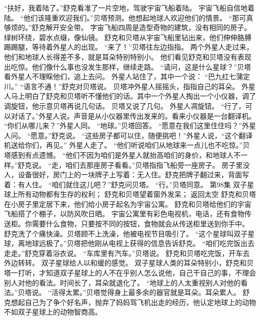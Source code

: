 \documentclass[a4paper,12pt,UTF8,twoside]{ctexbook}
\begin{document}
        “扶好，我着陆了。”舒克看准了一片空地，驾驶宇宙飞船着陆。 
        宇宙飞船自信地着陆。 
        “他们该隆重欢迎我们。”贝塔预测。他想起地球人欢迎他们的情景。 
        “那可真够烦的。”舒克解开安全带。 
        字宙飞船四周是造型奇物的建筑，没有相同的房子。绿树环绕，碧水点缀，像仙镜。 
        舒克和贝塔从宇宙飞船里钻出来，他们伸伸胳膊踢踢腿，等待着外星人的出现。 
        “来了！”贝塔往左边指指。 
        两个外星人走过来，他们和地球人长得差不多，就是耳朵特别特别小。 
        他们看见舒克和贝塔没有表现出吃惊。他们像什么事也没发生那样，继续走路。 
        “请问，这是什么星球？”贝塔看外星人不理睬他们，追上去问。 
        外星人站住了，其中一个说： 
        “巴九红七蒲定川。” 
        “语言不通！”舒克对贝塔说。 
        贝塔冲外星人摇摇头，指指自己的耳朵。 
        外星人马上明白了舒克和贝塔听不懂他们的话。其中一个外星人掏出一个小仪器，调了调旋钮，他示意贝塔再说几句话。 
        贝塔又说了几句。 
        外星人凋旋钮。 
        “行了，可以对话了。”外星人说。声音是从小仪器里传出发来的。看来小仪器是一台翻译机。 
        “你们从哪儿来？”外星人同。 
        “地球。”贝塔回答。 
        “愿意在我们这里住住吗？”外星人问。 
        “愿意。”舒克说。 
        “这些房子都可以住，随便挑吧！”外星人说，“这个翻译机送给你们，再见。” 
        外星人走了。 
        “他们听说咱们从地球来一点儿也不吃惊。”贝塔感到有点遗憾。 
        “他们不因为咱们是外星人就抬高咱们的身价，和地球人不一样。”舒克说。 
        “走，咱们去那座房子看看。”贝塔指指飞船旁一座房子。 
      房子里没人，设备很好，房门上的一块牌子上写着：无人住。舒克把牌子翻过来，背面写着：有人住。 
        “咱们就住这儿吧？”舒克问贝塔。 
        “行。”贝塔同意。   第98集 
        双子星球上所有动物都有生存的权利； 
        舒克和贝塔望着窗外发呆； 
        返回太空   
        舒克和贝塔在小房子里定居下来，他们给小房子起名为宇宙公寓。 
        舒克和贝塔给他们的宇宙飞船搭了个棚子，以防风吹日晒。 
        宇宙公寓里有彩色电视机，电话，还有食物传送柜。你需要什么食物，只要按不同的按钮，食物就会从传送柜里送到你手中。 
        舒克洗了个痛快澡。贝塔顾不上洗澡，他被电视节目吸引了。 
        “这个星球叫双子星球，离地球远极了。”贝塔把他刚从电视上获得的信息告诉舒克。 
        “咱们吃完饭出去走走。”舒克穿着浴衣说。 
        “车库里有汽车。”贝塔说。 
        舒克和贝塔吃完饭，开车去外边转转。 
        双子星球给人以和缓的感觉。 
        双子星球人类的耳朵特别小，舒克和贝塔一打听，才知道双子星球上的人不在乎别人怎么说他，自己干自己的事，不理会别人对他的看法。时间长了，耳朵就退化了。 
        “地球上的人太重视别人对他的看法。”贝塔说。 
        “活得太累。”贝塔觉得身上最多余的器官就是耳朵。耳朵累人。 
        舒克想起自己为了争个好名声，抛弃了妈妈驾飞机出走的经历，他认定地球上的动物不如双子星球上的动物智商高。 
\end{document}
